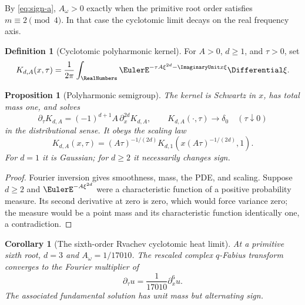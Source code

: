 \documentclass[11pt]{article}
\newtheorem{proposition}[theorem]{Proposition}
\newtheorem{corollary}[theorem]{Corollary}
\theoremstyle{definition}
\newtheorem{definition}[theorem]{Definition}
\begin{document}
By \cref{eq:sign-a}, $A_\omega>0$ exactly when the primitive root order satisfies $m\equiv2\pmod4$.  In that case the cyclotomic limit decays on the real frequency axis.

\begin{definition}[Cyclotomic polyharmonic kernel]
For $A>0$, $d\ge1$, and $\tau>0$, set
\begin{equation}
 K_{d,A}(x,\tau)
 =\frac1{2\pi}\int_{\RealNumbers}
 \EulerE^{-\tau A\xi^{2d}-\ImaginaryUnit x\xi}\Differential\xi.
 \label{eq:heat-kernel}
\end{equation}
\end{definition}

\begin{proposition}[Polyharmonic semigroup]
The kernel is Schwartz in $x$, has total mass one, and solves
\begin{equation}
 \partial_\tau K_{d,A}
 =(-1)^{d+1}A\,\partial_x^{2d}K_{d,A},
 \qquad
 K_{d,A}(\cdot,\tau)\to\delta_0
 \quad(\tau\downarrow0)
 \label{eq:polyharmonic-PDE}
\end{equation}
in the distributional sense.  It obeys the scaling law
\begin{equation}
 K_{d,A}(x,\tau)
 =(A\tau)^{-1/(2d)}
 K_{d,1}\left(x(A\tau)^{-1/(2d)},1\right).
 \label{eq:kernel-scaling}
\end{equation}
For $d=1$ it is Gaussian; for $d\ge2$ it necessarily changes sign.
\end{proposition}

\begin{proof}
Fourier inversion gives smoothness, mass, the PDE, and scaling.  Suppose $d\ge2$ and $\EulerE^{-A\xi^{2d}}$ were a characteristic function of a positive probability measure.  Its second derivative at zero is zero, which would force variance zero; the measure would be a point mass and its characteristic function identically one, a contradiction.
\end{proof}

\begin{corollary}[The sixth-order Rvachev cyclotomic heat limit]
At a primitive sixth root, $d=3$ and $A_\omega=1/17010$.  The rescaled complex $q$-Fabius transform converges to the Fourier multiplier of
\begin{equation}
 \partial_\tau u=\frac1{17010}\partial_x^6u.
 \label{eq:sixth-pde}
\end{equation}
The associated fundamental solution has unit mass but alternating sign.
\end{corollary}
\end{document}
